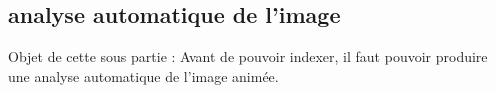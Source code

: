 \subsection{analyse automatique de l'image}

Objet de cette sous partie : 
Avant de pouvoir indexer, il faut pouvoir produire une analyse automatique de l'image animée. 